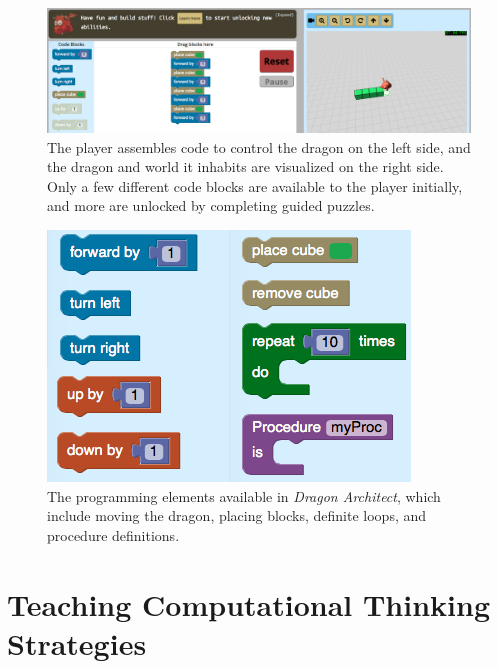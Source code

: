 \documentclass[conference]{IEEEtran}
\newcommand{\gametitle}{{\emph{Dragon Architect}}}
\begin{document}
\begin{figure}[t!]
  \centering
  \includegraphics[width=\textwidth]{images/overall-example-cropped}
  \caption{The player assembles code to control the dragon on the left side, and the dragon and world it inhabits are visualized on the right side. Only a few different code blocks are available to the player initially, and more are unlocked by completing guided puzzles.}
  \label{fig:overall}
\end{figure}

\begin{figure}[htb]
  \centering
  \includegraphics[width=\columnwidth]{images/toolbox-wide}
  \caption{The programming elements available in \gametitle{}, which include moving the dragon, placing blocks, definite loops, and procedure definitions.}
  \label{fig:toolbox}
\end{figure}

\section{Teaching Computational Thinking Strategies}
\end{document}
